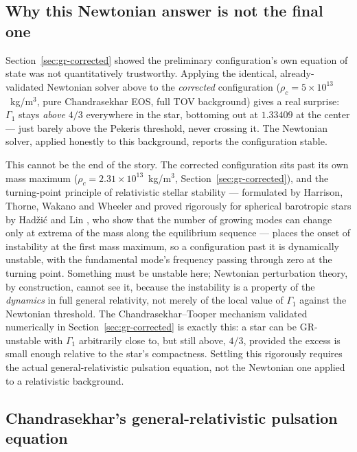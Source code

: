 \documentclass[11pt]{article}
\begin{document}
\subsection{Why this Newtonian answer is not the final one}
\label{sec:why-newtonian-insufficient}

Section~\ref{sec:gr-corrected} showed the preliminary configuration's own equation of state was not quantitatively trustworthy. Applying the identical, already-validated Newtonian solver above to the \emph{corrected} configuration ($\rho_c=5\times10^{13}$~kg/m$^3$, pure Chandrasekhar EOS, full TOV background) gives a real surprise: $\Gamma_1$ stays \emph{above} $4/3$ everywhere in the star, bottoming out at $1.33409$ at the center --- just barely above the Pekeris threshold, never crossing it. The Newtonian solver, applied honestly to this background, reports the configuration stable.

This cannot be the end of the story. The corrected configuration sits past its own mass maximum ($\rho_c=2.31\times10^{13}$~kg/m$^3$, Section~\ref{sec:gr-corrected}), and the turning-point principle of relativistic stellar stability --- formulated by Harrison, Thorne, Wakano and Wheeler \citep{HTWW1965} and proved rigorously for spherical barotropic stars by Had\v{z}i\'c and Lin \citep{HadzicLin2021}, who show that the number of growing modes can change only at extrema of the mass along the equilibrium sequence --- places the onset of instability at the first mass maximum, so a configuration past it is dynamically unstable, with the fundamental mode's frequency passing through zero at the turning point. Something must be unstable here; Newtonian perturbation theory, by construction, cannot see it, because the instability is a property of the \emph{dynamics} in full general relativity, not merely of the local value of $\Gamma_1$ against the Newtonian threshold. The Chandrasekhar--Tooper mechanism validated numerically in Section~\ref{sec:gr-corrected} is exactly this: a star can be GR-unstable with $\Gamma_1$ arbitrarily close to, but still above, $4/3$, provided the excess is small enough relative to the star's compactness. Settling this rigorously requires the actual general-relativistic pulsation equation, not the Newtonian one applied to a relativistic background.

\subsection{Chandrasekhar's general-relativistic pulsation equation}
\label{sec:gr-pulsation}
\end{document}
